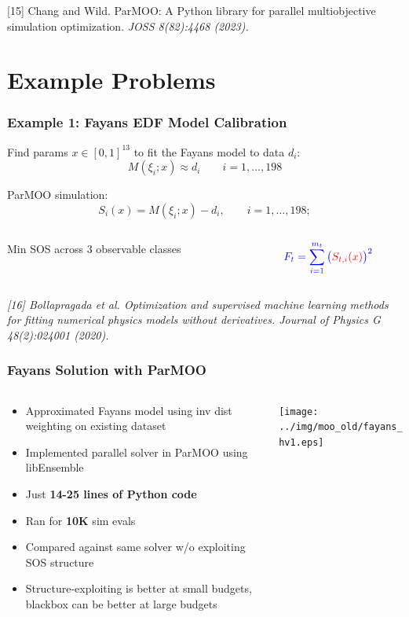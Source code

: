 \documentclass[aspectratio=169]{beamer}
\begin{document}
\begin{frame}
\bigskip
\bigskip

{\tiny
[15] Chang and Wild.
ParMOO: A Python library for parallel multiobjective simulation optimization.
{\sl JOSS 8(82):4468 (2023).}
}

\end{frame}

\section{Example Problems}

\begin{frame}\frametitle{Example 1: Fayans EDF Model Calibration}
Find params $x \in [0, 1]^{13}$ to fit the Fayans model to data $d_i$:
$$
M\left(\xi_{i};x\right) \approx d_{i} \qquad i=1,\ldots, 198
$$

\medskip

ParMOO simulation:
$$
S_{i}(x) = M\left(\xi_{i};x\right) - d_{i},
\qquad i=1,\ldots, 198;
$$

\medskip

\begin{columns}
\begin{column}{0.65\textwidth}
Min SOS across 3 observable classes
\end{column}
\begin{column}{0.35\textwidth}
$$
{\color{blue}F_t = \sum_{i=1}^{m_t}\big({\color{red}S_{t,i}(x)}\big)^2}
$$
\end{column}
\end{columns}

\vfill

{\tiny\it
[16] Bollapragada et al.
Optimization and supervised machine learning methods for fitting numerical physics models without derivatives.
Journal of Physics G 48(2):024001 (2020).\\}
\end{frame}

\begin{frame}\frametitle{Fayans Solution with ParMOO}
\begin{columns}
\begin{column}{0.5\textwidth}
\begin{itemize}
\item Approximated Fayans model using inv dist weighting on existing dataset
\item {\color{blue}
Implemented parallel solver in ParMOO} using libEnsemble
\item Just {\bf 14-25 lines of Python code}
\item Ran for {\bf 10K} sim evals
\item Compared against
{\color{red} same solver w/o exploiting SOS structure}
\item Structure-exploiting is better at small budgets, blackbox can be better at large budgets
\end{itemize}
\end{column}
\begin{column}{0.5\textwidth}
\texttt{[image: ../img/moo\_old/fayans\_hv1.eps]}
\end{column}
\end{columns}
\end{frame}
\end{document}
